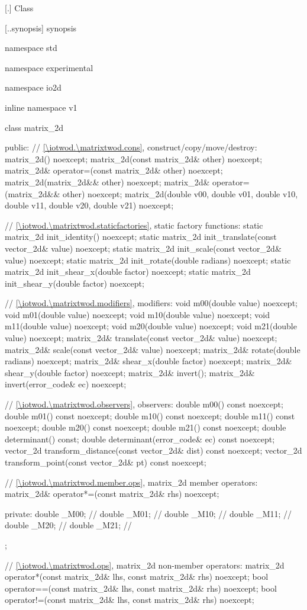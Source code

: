  [\iotwod.\matrixtwod] {Class }

 [\iotwod.\matrixtwod.synopsis] { synopsis}

\begin{codeblock}
namespace std { namespace experimental { namespace io2d { inline namespace v1 {
  class matrix_2d {
  public:
    // \ref{\iotwod.\matrixtwod.cons}, construct/copy/move/destroy:
    matrix_2d() noexcept;
    matrix_2d(const matrix_2d& other) noexcept;
    matrix_2d& operator=(const matrix_2d& other) noexcept;
    matrix_2d(matrix_2d&& other) noexcept;
    matrix_2d& operator=(matrix_2d&& other) noexcept;
    matrix_2d(double v00, double v01, double v10, double v11,
      double v20, double v21) noexcept;
    
    // \ref{\iotwod.\matrixtwod.staticfactories}, static factory functions:
    static matrix_2d init_identity() noexcept;
    static matrix_2d init_translate(const vector_2d& value) noexcept;
    static matrix_2d init_scale(const vector_2d& value) noexcept;
    static matrix_2d init_rotate(double radians) noexcept;
    static matrix_2d init_shear_x(double factor) noexcept;
    static matrix_2d init_shear_y(double factor) noexcept;
    
    // \ref{\iotwod.\matrixtwod.modifiers}, modifiers:
    void m00(double value) noexcept;
    void m01(double value) noexcept;
    void m10(double value) noexcept;
    void m11(double value) noexcept;
    void m20(double value) noexcept;
    void m21(double value) noexcept;
    matrix_2d& translate(const vector_2d& value) noexcept;
    matrix_2d& scale(const vector_2d& value) noexcept;
    matrix_2d& rotate(double radians) noexcept;
    matrix_2d& shear_x(double factor) noexcept;
    matrix_2d& shear_y(double factor) noexcept;
    matrix_2d& invert();
    matrix_2d& invert(error_code& ec) noexcept;
    
    // \ref{\iotwod.\matrixtwod.observers}, observers:
    double m00() const noexcept;
    double m01() const noexcept;
    double m10() const noexcept;
    double m11() const noexcept;
    double m20() const noexcept;
    double m21() const noexcept;
    double determinant() const;
    double determinant(error_code& ec) const noexcept;
    vector_2d transform_distance(const vector_2d& dist) const noexcept;
    vector_2d transform_point(const vector_2d& pt) const noexcept;
    
    // \ref{\iotwod.\matrixtwod.member.ops}, matrix_2d member operators:
    matrix_2d& operator*=(const matrix_2d& rhs) noexcept;
    
  private:
    double _M00; // \expos
    double _M01; // \expos
    double _M10; // \expos
    double _M11; // \expos
    double _M20; // \expos
    double _M21; // \expos
  };
    
  // \ref{\iotwod.\matrixtwod.ops}, matrix_2d non-member operators:
  matrix_2d operator*(const matrix_2d& lhs, const matrix_2d& rhs) noexcept;
  bool operator==(const matrix_2d& lhs, const matrix_2d& rhs) noexcept;
  bool operator!=(const matrix_2d& lhs, const matrix_2d& rhs) noexcept;
} } } }
\end{codeblock}

